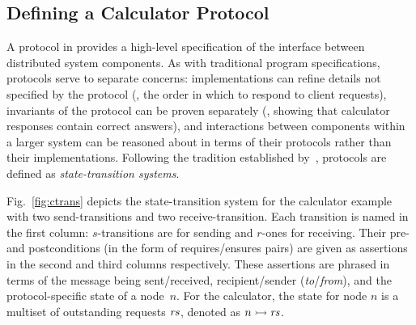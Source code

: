 \subsection{Defining a Calculator Protocol}
\label{sec:calc-prot}

A protocol in \disel provides a high-level specification of the interface
between distributed system components.
%
As with traditional program specifications, \disel protocols serve to
separate concerns: implementations can refine details not specified by
the protocol (\eg, the order in which to respond to client requests),
invariants of the protocol can be proven separately (\eg, showing that
calculator responses contain correct answers), and interactions
between components within a larger system can be reasoned about in
terms of their protocols rather than their implementations.
%
Following the tradition established by~\citet{Lamport:CN78}, \disel
protocols are defined as \emph{state-transition systems}.

Fig.~\ref{fig:ctrans} depicts the state-transition system for the
calculator example with two send-transitions and two
receive-transition.
%
Each transition is named in the first column: $s$-transitions are for
sending and $r$-ones for receiving. Their pre- and postconditions
(in the form of requires/ensures pairs) are given as assertions in the
second and third columns respectively.
%
These assertions are phrased in terms of the message being
sent/received, recipient/sender (\emph{to}/\emph{from}), and the
protocol-specific state of a node~$n$.
%
For the calculator, the state for node $n$ is a multiset of
outstanding requests $\mathit{rs}$, denoted as $n \ppts{} \Rs$.


